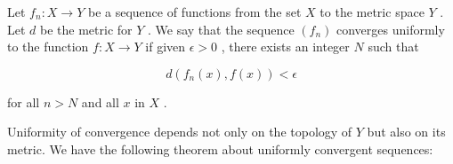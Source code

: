 \begin{definition} Let \({f}_{n} : X \rightarrow  Y\) be a sequence of functions from the set \(X\) to the metric space \(Y\) . Let \(d\) be the metric for \(Y\) . We say that the sequence \(\left( {f}_{n}\right)\) converges uniformly to the function \(f : X \rightarrow  Y\) if given \(\epsilon  > 0\) , there exists an integer \(N\) such that

\[
d\left( {{f}_{n}\left( x\right) ,f\left( x\right) }\right)  < \epsilon
\]

for all \(n > N\) and all \(x\) in \(X\) .
\end{definition}

Uniformity of convergence depends not only on the topology of \(Y\) but also on its metric. We have the following theorem about uniformly convergent sequences:

